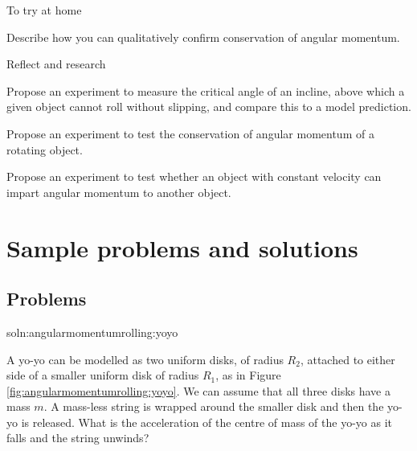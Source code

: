 \begin{chapteractivity}{To try at home}
{
\item Describe how you can qualitatively confirm conservation of angular momentum. 
}
\end{chapteractivity}

\begin{chapteractivity}{Reflect and research}
{
\item Propose an experiment to measure the critical angle of an incline, above which a given object cannot roll without slipping, and compare this to a model prediction.
\item Propose an experiment to test the conservation of angular momentum of a rotating object. 
\item Propose an experiment to test whether an object with constant velocity can impart angular momentum to another object.
}
\end{chapteractivity}


\newpage
\section{Sample problems and solutions}
\subsection{Problems}
\begin{problem}{soln:angularmomentumrolling:yoyo}{\label{prob:angularmomentumrolling:yoyo} A yo-yo can be modelled as two uniform disks, of radius $R_2$, attached to either side of a smaller uniform disk of radius $R_1$, as in Figure \ref{fig:angularmomentumrolling:yoyo}. We can assume that all three disks have a mass $m$. A mass-less string is wrapped around the smaller disk and then the yo-yo is released. What is the acceleration of the centre of mass of the yo-yo as it falls and the string unwinds?

}
\end{problem}

